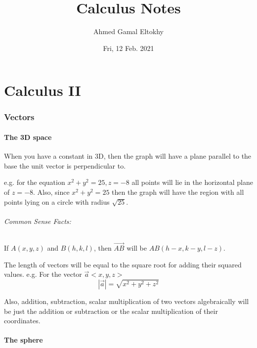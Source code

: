 \documentclass{article}
\title{Calculus Notes}
\date{Fri, 12 Feb. 2021}
\author{Ahmed Gamal Eltokhy}
\begin{document}
\maketitle
{}
\newpage

\tableofcontents
\newpage


\part{Calculus II}
\newpage

\section{Vectors}

\subsection{The 3D space}

When you have a constant in 3D, then the graph will have a plane parallel to the base the unit vector is perpendicular to.

e.g. for the equation $x^2+y^2=25, z=-8$ all points will lie in the horizontal plane of $z=-8$. Also, since $x^2+y^2=25$ then the graph will have the region with all points lying on a circle with radius $\sqrt{25}$.

\paragraph{Common Sense Facts:}

If $A(x,y,z)$ and $B(h,k,l)$, then $\vec{AB}$ will be $AB(h-x, k-y, l-z)$.

The length of vectors will be equal to the square root for adding their squared values. e.g. For the vector $\vec{a}<x,y,z>$
\begin{equation*}
	|\vec{a}| = \sqrt{x^2+y^2+z^2}
\end{equation*}

Also, addition, subtraction, scalar multiplication of two vectors algebraically will be just the addition or subtraction or the scalar multiplication of their coordinates.



\subsection{The sphere}
\end{document}
